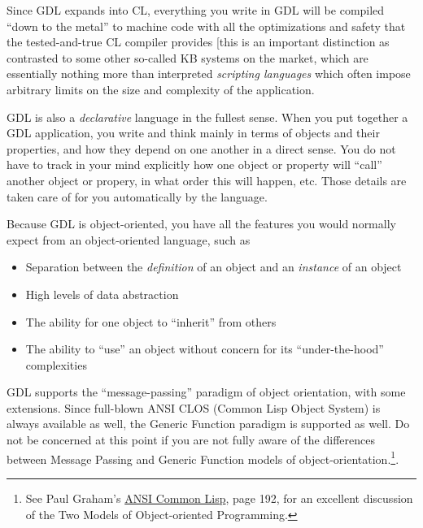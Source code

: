 \documentclass [11pt]{book}
\begin{document}
Since GDL expands into CL, everything you write in GDL will be
compiled ``down to the metal'' to machine code with all the
optimizations and safety that the tested-and-true CL compiler provides
[this is an important distinction as contrasted to some other
so-called KB systems on the market, which are essentially nothing more
than interpreted \emph{scripting languages} which often impose arbitrary limits on
the size and complexity of the application.

GDL is also a \emph{declarative} language in the fullest sense. When you put together a GDL application, you write and think mainly
in terms of objects and their properties, and how they depend on one another in a direct
sense. You do not have to track in your mind explicitly how one object or property will ``call''
another object or propery, in what order this will happen, etc. Those details are
taken care of for you automatically by the language. 

Because GDL is object-oriented, you have all the features you would normally expect
from an object-oriented language, such as 

\begin{itemize}

\item Separation between the \emph{definition} of an object and an \emph{instance} of an object

\item High levels of data abstraction

\item The ability for one object to ``inherit'' from others

\item The ability to ``use'' an object without concern for
	its ``under-the-hood'' complexities

\end{itemize}

GDL supports the ``message-passing'' paradigm of object
orientation, with some extensions. Since full-blown ANSI CLOS (Common
Lisp Object System) is always available as well, the Generic Function
paradigm is supported as well. Do not be concerned at this point if
you are not fully aware of the differences between Message Passing
and Generic Function models of object-orientation.\footnote{See Paul Graham's 
\underline{ANSI Common Lisp}, page 192, for an excellent discussion of the Two Models 
of Object-oriented Programming.}.
\end{document}
